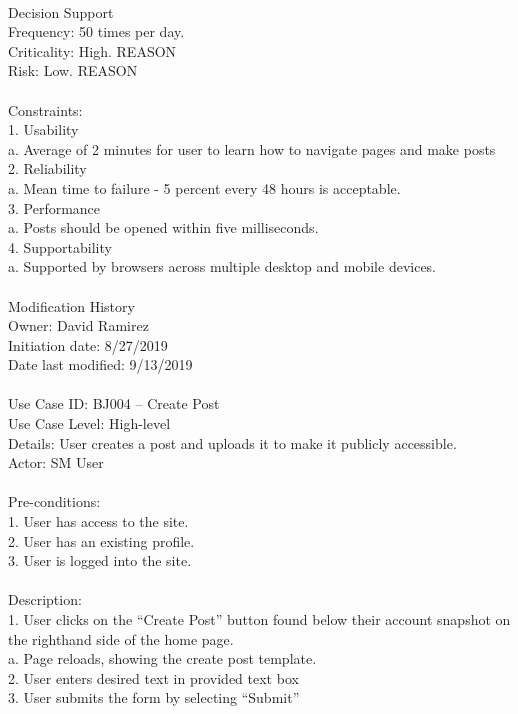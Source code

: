 \documentclass{report}
\begin{document}
\\
Decision Support\\
     Frequency: 50 times per day.\\
     Criticality: High. REASON\\
     Risk: Low. REASON\\
\\
Constraints:\\
1.	Usability\\
	a.	Average of 2 minutes for user to learn how to navigate pages and make posts\\
2.	Reliability\\
	a.	Mean time to failure - 5 percent every 48 hours is acceptable.\\
3.	Performance\\
	a.	Posts should be opened within five milliseconds.\\
4.	Supportability\\
	a.	Supported by browsers across multiple desktop and mobile devices.\\
\\
Modification History\\
     Owner: David Ramirez\\
     Initiation date: 8/27/2019\\
     Date last modified: 9/13/2019\\
\\
Use Case ID: BJ004 – Create Post\\
Use Case Level: High-level\\
Details: User creates a post and uploads it to make it publicly accessible.\\
Actor: SM User\\
\\
Pre-conditions: \\
1.	User has access to the site.\\
2.	User has an existing profile.\\
3.	User is logged into the site.\\
\\
Description: \\
1.	User clicks on the “Create Post” button found below their account snapshot on the righthand side of the home page.\\
	a.	Page reloads, showing the create post template. \\
2.	User enters desired text in provided text box\\
3.	User submits the form by selecting “Submit”\\
\end{document}
